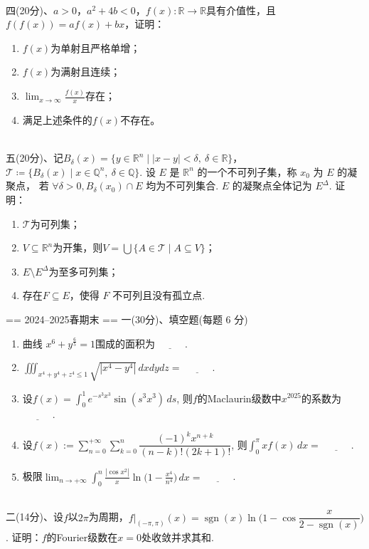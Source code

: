 ~\\
四(20分)、$a>0$，$a^{2}+4 b<0$，$f(x):\mathbb{R}\to\mathbb{R}$具有介值性，且$f(f(x))=a f(x)+b x$，证明：
\begin{enumerate}
    \item [(1)] $f(x)$为单射且严格单增；
    \item [(2)] $f(x)$为满射且连续；
    \item [(3)] $\displaystyle\lim _{x \to \infty} \frac{f(x)}{x}$存在；
    \item [(4)] 满足上述条件的$f(x)$不存在。
\end{enumerate}
~\\
五(20分)、记$B_{\delta}(x) = \{ y \in \mathbb{R}^n \mid |x - y| < \delta,\ \delta \in \mathbb{R} \}$，
$\mathcal{T} \coloneqq \{ B_{\delta}(x) \mid x \in \mathbb{Q}^n,\ \delta \in \mathbb{Q} \}$.
设 $E$ 是 $\mathbb R^n$ 的一个不可列子集，称 $x_0$ 为 $E$ 的凝聚点，
若 $\forall\delta>0,B_\delta(x_0)\cap E$ 均为不可列集合. $E$ 的凝聚点全体记为 $E^\Delta$. 证明：
\begin{enumerate}
    \item [(1)] $\mathcal{T}$为可列集；
    \item [(2)]$V \subseteq \mathbb{R}^{n}$为开集，则$V=\bigcup\{A \in \mathcal{T} \mid A \subseteq V\}$；
    \item [(3)] $E \setminus E^{\Delta}$为至多可列集；
    \item [(4)] 存在$F \subseteq E$，使得 $F$ 不可列且没有孤立点.
\end{enumerate}

== 2024--2025春期末 ==
一(30分)、填空题(每题 6 分)
\begin{enumerate}[label=(\arabic*)]
    \item 曲线 $x^6 + y^{\frac 6 5} = 1$围成的面积为$\underline{\qquad\quad}$.
    \item $\displaystyle \iiint_{x^4+y^4+z^4\le1} \sqrt{|x^4 - y^4|} \, dx dy dz=\underline{\qquad\quad}$.
    \item 设$f(x)=\displaystyle\int_0^1 e^{-s^3x^3}\sin(s^3x^3) \, ds$, 
    则$f$的Maclaurin级数中$x^{2025}$的系数为$\underline{\qquad\quad}$.
    \item 设$f(x):=\displaystyle\sum_{n=0}^{+\infty}\sum_{k=0}^n \dfrac{(-1)^kx^{n+k}}{(n-k)!(2k+1)!}$, 
    则$\displaystyle\int_0^{\pi} xf(x) \,dx=\underline{\qquad\quad}$.
    \item 极限$\displaystyle\lim_{n\to +\infty}\int_0^n \frac{|\cos x^2|}{x}\ln \Big(1-\frac{x^4}{n^4}\Big)\, dx=\underline{\qquad\quad}$.
\end{enumerate}
~\\
二(14分)、设$f$以$2\pi$为周期，$\displaystyle f\big|_{(-\pi,\pi)}(x)=
\operatorname{sgn}(x)\ln \Big(1-\cos \dfrac{x}{2-\operatorname{sgn}(x)}\Big)$. 
证明：$f$的Fourier级数在$x=0$处收敛并求其和.
~\\


